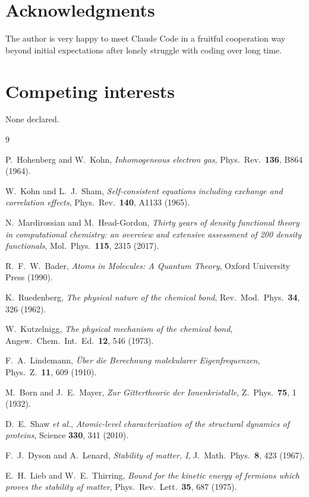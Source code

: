 \documentclass[11pt]{article}
\begin{document}
\section*{Acknowledgments}

The author is very happy to meet Claude Code in a fruitful cooperation way beyond initial expectations after lonely struggle with coding over long time.

\section*{Competing interests}

None declared.

\begin{thebibliography}{9}

P.~Hohenberg and W.~Kohn,
\emph{Inhomogeneous electron gas},
Phys.\ Rev.\ \textbf{136}, B864 (1964).

W.~Kohn and L.~J.~Sham,
\emph{Self-consistent equations including exchange and correlation effects},
Phys.\ Rev.\ \textbf{140}, A1133 (1965).

N.~Mardirossian and M.~Head-Gordon,
\emph{Thirty years of density functional theory in computational chemistry: an overview and extensive assessment of 200 density functionals},
Mol.\ Phys.\ \textbf{115}, 2315 (2017).

R.~F.~W.~Bader,
\emph{Atoms in Molecules: A Quantum Theory},
Oxford University Press (1990).

K.~Ruedenberg,
\emph{The physical nature of the chemical bond},
Rev.\ Mod.\ Phys.\ \textbf{34}, 326 (1962).

W.~Kutzelnigg,
\emph{The physical mechanism of the chemical bond},
Angew.\ Chem.\ Int.\ Ed.\ \textbf{12}, 546 (1973).

F.~A.~Lindemann,
\emph{\"Uber die Berechnung molekularer Eigenfrequenzen},
Phys.\ Z.\ \textbf{11}, 609 (1910).

M.~Born and J.~E.~Mayer,
\emph{Zur Gittertheorie der Ionenkristalle},
Z.~Phys.\ \textbf{75}, 1 (1932).

D.~E.~Shaw \emph{et al.},
\emph{Atomic-level characterization of the structural dynamics of proteins},
Science \textbf{330}, 341 (2010).

F.~J.~Dyson and A.~Lenard,
\emph{Stability of matter, I},
J.\ Math.\ Phys.\ \textbf{8}, 423 (1967).

E.~H.~Lieb and W.~E.~Thirring,
\emph{Bound for the kinetic energy of fermions which proves the stability of matter},
Phys.\ Rev.\ Lett.\ \textbf{35}, 687 (1975).

\end{thebibliography}
\end{document}

